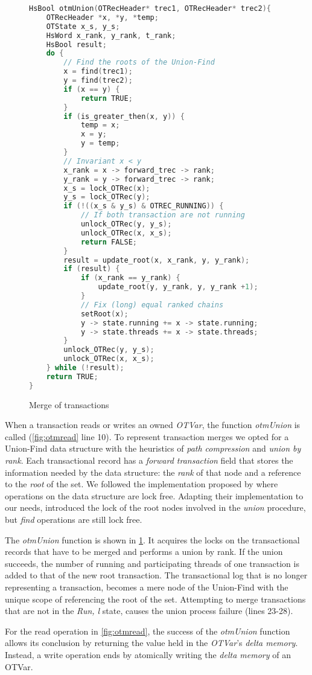 \begin{figure}
\begin{lstlisting}[language=C]
HsBool otmUnion(OTRecHeader* trec1, OTRecHeader* trec2){
    OTRecHeader *x, *y, *temp;
    OTState x_s, y_s;
    HsWord x_rank, y_rank, t_rank;
    HsBool result;
    do {
        // Find the roots of the Union-Find
        x = find(trec1);
        y = find(trec2);
        if (x == y) {
            return TRUE;
        }
        if (is_greater_then(x, y)) {
            temp = x;
            x = y;
            y = temp;
        }
        // Invariant x < y
        x_rank = x -> forward_trec -> rank;
        y_rank = y -> forward_trec -> rank;
        x_s = lock_OTRec(x);
        y_s = lock_OTRec(y);
        if (!((x_s & y_s) & OTREC_RUNNING)) {
            // If both transaction are not running
            unlock_OTRec(y, y_s);
            unlock_OTRec(x, x_s);
            return FALSE;
        }
        result = update_root(x, x_rank, y, y_rank);
        if (result) {
            if (x_rank == y_rank) {
                update_root(y, y_rank, y, y_rank +1);
            }
            // Fix (long) equal ranked chains
            setRoot(x);
            y -> state.running += x -> state.running;
            y -> state.threads += x -> state.threads;
        }
        unlock_OTRec(y, y_s);
        unlock_OTRec(x, x_s);
    } while (!result);
    return TRUE;
}
\end{lstlisting}
\caption{Merge of transactions}
\label{fig:otmunion}
\end{figure}

When a transaction reads or writes an owned \emph{OTVar}, the function \emph{otmUnion} is called (\cref{fig:otmread} line 10).
To represent transaction merges we opted for a Union-Find data structure with the heuristics of \emph{path compression} and \emph{union by rank}.
Each transactional record has a \emph{forward transaction} field that stores the information needed by the data structure: the \emph{rank} of that node and a reference to the \emph{root} of the set.
We followed the implementation proposed by \citet{Anderson94wait-freeparallel} where operations on the data structure are lock free.
Adapting their implementation to our needs, introduced the lock of the root nodes involved in the \emph{union} procedure, but \emph{find} operations are still lock free.

The \emph{otmUnion} function is shown in \cref{fig:otmunion}. It acquires the locks on the transactional records that have to be merged and performs a union by rank. If the union succeeds, the number of running and participating threads of one transaction is added to that of the new root transaction. The transactional log that is no longer representing a transaction, becomes a mere node of the Union-Find with the unique scope of referencing the root of the set. Attempting to merge transactions that are not in the \emph{Ru\textlangle n, l\textrangle} state, causes the union process failure (lines 23-28).

For the read operation in \cref{fig:otmread}, the success of the \emph{otmUnion} function allows its conclusion by returning the value held in the \emph{OTVar}'s \emph{delta memory}. Instead, a write operation ends by atomically writing the \emph{delta memory} of an OTVar.

